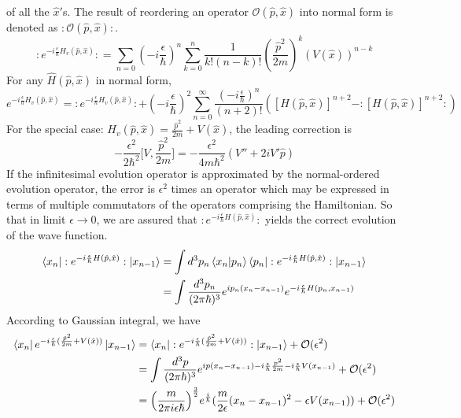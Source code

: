 \documentclass[12pt]{article}
\begin{document}
of all the $\hat{x}'$s. The result of reordering an operator 
$\mathcal{O}(\hat{p},\hat{x})$ into normal form is denoted as 
$:\mathcal{O}(\hat{p},\hat{x}):$.
\begin{equation*}
    :e^{-i\frac{\epsilon}{\hbar}H_v(\hat{p},\hat{x})}:
    =\sum_{n=0}(-i\frac{\epsilon}{\hbar})^n\sum_{k=0}^n\frac{1}{k!(n-k)!}
    (\frac{\hat{p}^2}{2m})^k(V(\hat{x}))^{n-k}
\end{equation*}
For any $\hat{H}(\hat{p},\hat{x})$ in normal form,
\begin{equation*}
    e^{-i\frac{\epsilon}{\hbar}H_v(\hat{p},\hat{x})}=
    :e^{-i\frac{\epsilon}{\hbar}H_v(\hat{p},\hat{x})}:+(-i\frac{\epsilon}{\hbar})^2
    \sum_{n=0}^\infty\frac{(-i\frac{\epsilon}{\hbar})^n}{(n+2)!}
    \left([H(\hat{p},\hat{x})]^{n+2}-:[H(\hat{p},\hat{x})]^{n+2}:\right)
\end{equation*}
For the special case: $H_v(\hat{p},\hat{x})=\frac{\hat{p}^2}{2m}+V(\hat{x})$, the 
leading correction is 
\begin{equation*}
    -\frac{\epsilon^2}{2\hbar^2}\Big[V,\frac{\hat{p}^2}{2m}\Big]
    =-\frac{\epsilon^2}{4m\hbar^2}(V''+2iV'\hat{p})
\end{equation*}
If the infinitesimal evolution operator is approximated by the normal-ordered 
evolution operator, the error is $\epsilon^2$ times an operator which may be 
expressed in terms of multiple commutators of the operators comprising the 
Hamiltonian. So that in limit $\epsilon\rightarrow0$, we are assured that 
$:e^{-i\frac{\epsilon}{\hbar}H(\hat{p},\hat{x})}:$ yields the correct evolution 
of the wave function.
\begin{equation*}
    \begin{split}
        \bra{x_n}:e^{-i\frac{\epsilon}{\hbar}H(\hat{p},\hat{x})}:\ket{x_{n-1}}
        &=\int d^3p_n \braket*{x_n}{p_n}\bra{p_n}
        :e^{-i\frac{\epsilon}{\hbar}H(\hat{p},\hat{x})}:\ket{x_{n-1}}\\
        &=\int\frac{d^3p_n}{(2\pi\hbar)^3}e^{ip_n(x_n-x_{n-1})}
        e^{-i\frac{\epsilon}{\hbar}H(p_n,x_{n-1})}
    \end{split}
\end{equation*}
According to Gaussian integral, we have
\begin{equation*}
   \begin{split}
    \bra{x_n}e^{-i\frac{\epsilon}{\hbar}(\frac{\hat{p}^2}{2m}+V(\hat{x}))}
    \ket{x_{n-1}}&=\bra{x_n}:e^{-i\frac{\epsilon}{\hbar}(\frac{\hat{p}^2}{2m}
    +V(\hat{x}))}:\ket{x_{n-1}}+\mathcal{O}(\epsilon^2)\\
    &=\int\frac{d^3p}{(2\pi\hbar)^3}e^{ip(x_n-x_{n-1})-i\frac{\epsilon}{\hbar}
    \frac{p^2}{2m}-i\frac{\epsilon}{\hbar}V(x_{n-1})}+\mathcal{O}(\epsilon^2)\\
    &=\Big(\frac{m}{2\pi i\epsilon\hbar}\Big)^{\frac{3}{2}}
    e^{\frac{i}{\hbar}}(\frac{m}{2\epsilon}(x_n-x_{n-1})^2-\epsilon V(x_{n-1}))
    +\mathcal{O}(\epsilon^2)
   \end{split} 
\end{equation*}
\end{document}
